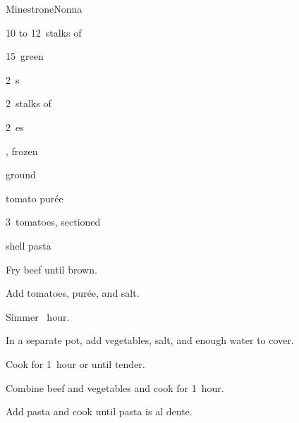 \begin{recipe}{Minestrone}{Nonna}{}

\begin{ingredients}
\item 10 to 12~stalks of 
\item 15~green 
\item 2~s
\item 2~stalks of 
\item 2~es
\item {} , frozen
\item \lbs{\half} ground 
\item {} tomato purée
\item 3~tomatoes, sectioned
\item \kgr{\half} shell pasta
\end{ingredients}

\begin{directions}
\item Fry beef until brown.
\item Add tomatoes, purée, and salt.
\item Simmer \half~hour.
\item In a separate pot, add vegetables, salt, and enough water to cover.
\item Cook for 1~hour or until tender.
\item Combine beef and vegetables and cook for 1~hour.
\item Add pasta and cook until pasta is al dente.
\end{directions}

\end{recipe}

